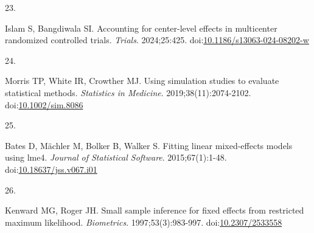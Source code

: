 \documentclass[
  11pt,
]{article}
\newlength{\cslhangindent}
\newlength{\csllabelwidth}
\newenvironment{CSLReferences}[2] %
 {\begin{list}{}{%
  \setlength{\itemindent}{0pt}
  \setlength{\leftmargin}{0pt}
  \setlength{\parsep}{0pt}
  \ifodd #1
   \setlength{\leftmargin}{\cslhangindent}
   \setlength{\itemindent}{-1\cslhangindent}
  \fi
  \setlength{\itemsep}{#2\baselineskip}}}
 {\end{list}}
\newcommand{\CSLLeftMargin}[1]{\parbox[t]{\csllabelwidth}{\strut#1\strut}}
\newcommand{\CSLRightInline}[1]{\parbox[t]{\linewidth - \csllabelwidth}{\strut#1\strut}}
\begin{document}
\begin{CSLReferences}{0}{1}
\CSLLeftMargin{23. }%
\CSLRightInline{Islam S, Bangdiwala SI. Accounting for center-level effects in multicenter randomized controlled trials. \emph{Trials}. 2024;25:425. doi:\href{https://doi.org/10.1186/s13063-024-08202-w}{10.1186/s13063-024-08202-w}}

\CSLLeftMargin{24. }%
\CSLRightInline{Morris TP, White IR, Crowther MJ. Using simulation studies to evaluate statistical methods. \emph{Statistics in Medicine}. 2019;38(11):2074-2102. doi:\href{https://doi.org/10.1002/sim.8086}{10.1002/sim.8086}}

\CSLLeftMargin{25. }%
\CSLRightInline{Bates D, Mächler M, Bolker B, Walker S. Fitting linear mixed-effects models using {lme4}. \emph{Journal of Statistical Software}. 2015;67(1):1-48. doi:\href{https://doi.org/10.18637/jss.v067.i01}{10.18637/jss.v067.i01}}

\CSLLeftMargin{26. }%
\CSLRightInline{Kenward MG, Roger JH. Small sample inference for fixed effects from restricted maximum likelihood. \emph{Biometrics}. 1997;53(3):983-997. doi:\href{https://doi.org/10.2307/2533558}{10.2307/2533558}}

\end{CSLReferences}
\end{document}
